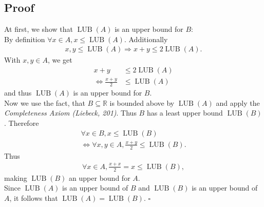 \documentclass{article}
\newcommand{\R}{\mathbb{R}}
\DeclareMathOperator{\lub}{\text{LUB}}
\begin{document}
\subsection*{Proof}
At first, we show that $\lub(A)$ is an upper bound for $B$:\\
By definition $\forall x \in A, x \leq \lub(A)$. Additionally
\begin{align*}
  x,y\leq \lub(A) \Rightarrow x + y \leq 2\lub(A).
\end{align*}
With $x,y\in A$, we get
\begin{align*}
  x+y&\leq 2\lub(A)\\
  \Leftrightarrow\frac{x+y}{2}&\leq \lub(A)
\end{align*}
and thus $\lub(A)$ is an upper bound for $B$.\\
Now we use the fact, that $B\subseteq \R$ is bounded above by $\lub(A)$ and apply the \emph{Completeness Axiom (Liebeck, 201)}. Thus $B$ has a least upper bound $\lub(B)$. Therefore
\begin{align*}
  \forall x \in B, x \leq \lub(B)\\
  \Leftrightarrow \forall x, y \in A, \frac{x+y}{2}\leq \lub(B).
\end{align*}
Thus
\begin{align*}
  \forall x \in A, \frac{x+x}{2}=x \leq \lub(B),
\end{align*}
making $\lub(B)$ an upper bound for $A$.\\
Since $\lub(A)$ is an upper bound of $B$ and $\lub(B)$ is an upper bound of $A$, it follows that $\lub(A)=\lub(B)$. $\square$ 
\end{document}
